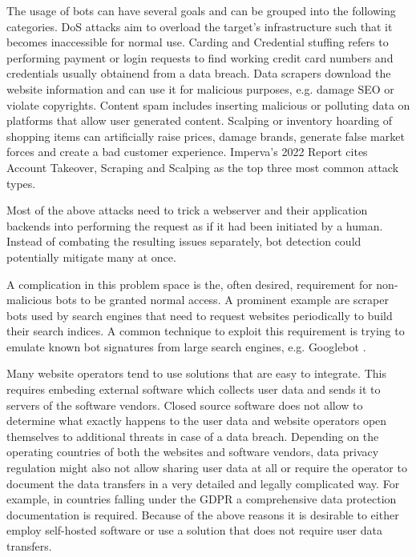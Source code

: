 \documentclass[
    fontsize=12pt,
    headings=small,
    parskip=half,           %
    bibliography=totoc,
    numbers=noenddot,       %
    open=any,               %
    final                   %
]{scrreprt}
\begin{document}
The usage of bots can have several goals and can be grouped into the following categories. DoS attacks aim to overload the target's infrastructure such that it becomes inaccessible for normal use. Carding and Credential stuffing refers to performing payment or login requests to find working credit card numbers and credentials usually obtainend from a data breach. Data scrapers download the website information and can use it for malicious purposes, e.g. damage SEO or violate copyrights. Content spam includes inserting malicious or polluting data on platforms that allow user generated content. Scalping or inventory hoarding of shopping items can artificially raise prices, damage brands, generate false market forces and create a bad customer experience. Imperva's 2022 Report\cite{BAD_BOT_REPORT2022} cites Account Takeover, Scraping and Scalping as the top three most common attack types.

Most of the above attacks need to trick a webserver and their application backends into performing the request as if it had been initiated by a human. Instead of combating the resulting issues separately, bot detection could potentially mitigate many at once.

A complication in this problem space is the, often desired, requirement for non-malicious bots to be granted normal access. A prominent example are scraper bots used by search engines that need to request websites periodically to build their search indices. A common technique to exploit this requirement is trying to emulate known bot signatures from large search engines, e.g. Googlebot \cite{8421894}.

Many website operators tend to use solutions that are easy to integrate. This requires embeding external software which collects user data and sends it to servers of the software vendors. Closed source software does not allow to determine what exactly happens to the user data and website operators open themselves to additional threats in case of a data breach. Depending on the operating countries of both the websites and software vendors, data privacy regulation might also not allow sharing user data at all or require the operator to document the data transfers in a very detailed and legally complicated way. For example, in countries falling under the GDPR \cite{GDPR} a comprehensive data protection documentation is required. Because of the above reasons it is desirable to either employ self-hosted software or use a solution that does not require user data transfers.
\end{document}
